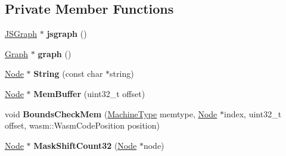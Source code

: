 \subsection*{Private Member Functions}
\begin{DoxyCompactItemize}
\item 
\hyperlink{classv8_1_1internal_1_1compiler_1_1_j_s_graph}{J\+S\+Graph} $\ast$ {\bfseries jsgraph} ()\hypertarget{classv8_1_1internal_1_1compiler_1_1_wasm_graph_builder_a3cf2dd38ca3baefab98e11a83da74978}{}\label{classv8_1_1internal_1_1compiler_1_1_wasm_graph_builder_a3cf2dd38ca3baefab98e11a83da74978}

\item 
\hyperlink{classv8_1_1internal_1_1compiler_1_1_graph}{Graph} $\ast$ {\bfseries graph} ()\hypertarget{classv8_1_1internal_1_1compiler_1_1_wasm_graph_builder_a365c7c046eaf17dea7cdab7caa76584a}{}\label{classv8_1_1internal_1_1compiler_1_1_wasm_graph_builder_a365c7c046eaf17dea7cdab7caa76584a}

\item 
\hyperlink{classv8_1_1internal_1_1compiler_1_1_node}{Node} $\ast$ {\bfseries String} (const char $\ast$string)\hypertarget{classv8_1_1internal_1_1compiler_1_1_wasm_graph_builder_a6c1cc36fa755835008e9b8eee6489e95}{}\label{classv8_1_1internal_1_1compiler_1_1_wasm_graph_builder_a6c1cc36fa755835008e9b8eee6489e95}

\item 
\hyperlink{classv8_1_1internal_1_1compiler_1_1_node}{Node} $\ast$ {\bfseries Mem\+Buffer} (uint32\+\_\+t offset)\hypertarget{classv8_1_1internal_1_1compiler_1_1_wasm_graph_builder_a06ea4cc2658d6a1d44c04520d0c82fe3}{}\label{classv8_1_1internal_1_1compiler_1_1_wasm_graph_builder_a06ea4cc2658d6a1d44c04520d0c82fe3}

\item 
void {\bfseries Bounds\+Check\+Mem} (\hyperlink{classv8_1_1internal_1_1_machine_type}{Machine\+Type} memtype, \hyperlink{classv8_1_1internal_1_1compiler_1_1_node}{Node} $\ast$index, uint32\+\_\+t offset, wasm\+::\+Wasm\+Code\+Position position)\hypertarget{classv8_1_1internal_1_1compiler_1_1_wasm_graph_builder_af524016a638948497014c0a2dac53afe}{}\label{classv8_1_1internal_1_1compiler_1_1_wasm_graph_builder_af524016a638948497014c0a2dac53afe}

\item 
\hyperlink{classv8_1_1internal_1_1compiler_1_1_node}{Node} $\ast$ {\bfseries Mask\+Shift\+Count32} (\hyperlink{classv8_1_1internal_1_1compiler_1_1_node}{Node} $\ast$node)\hypertarget{classv8_1_1internal_1_1compiler_1_1_wasm_graph_builder_a42192f9897369d87a7f08020bbf1b7e9}{}\label{classv8_1_1internal_1_1compiler_1_1_wasm_graph_builder_a42192f9897369d87a7f08020bbf1b7e9}


\end{DoxyCompactItemize}

